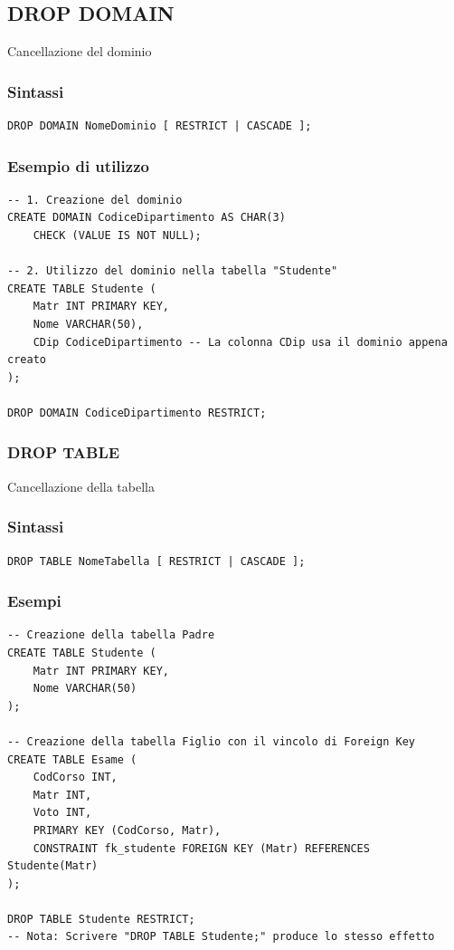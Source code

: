 \subsection{DROP DOMAIN}
Cancellazione del dominio

\subsubsection{Sintassi}
\begin{lstlisting}[language=sql_generic]
DROP DOMAIN NomeDominio [ RESTRICT | CASCADE ];
\end{lstlisting}

\subsubsection{Esempio di utilizzo}
\begin{lstlisting}[language=sql_generic]
-- 1. Creazione del dominio
CREATE DOMAIN CodiceDipartimento AS CHAR(3)
    CHECK (VALUE IS NOT NULL);

-- 2. Utilizzo del dominio nella tabella "Studente"
CREATE TABLE Studente (
    Matr INT PRIMARY KEY,
    Nome VARCHAR(50),
    CDip CodiceDipartimento -- La colonna CDip usa il dominio appena creato
);

DROP DOMAIN CodiceDipartimento RESTRICT;
\end{lstlisting}

\subsubsection{DROP TABLE}
Cancellazione della tabella

\subsubsection{Sintassi}
\begin{lstlisting}
DROP TABLE NomeTabella [ RESTRICT | CASCADE ];
\end{lstlisting}

\subsubsection{Esempi}
\begin{lstlisting}[language=sql_generic]
-- Creazione della tabella Padre
CREATE TABLE Studente (
    Matr INT PRIMARY KEY,
    Nome VARCHAR(50)
);

-- Creazione della tabella Figlio con il vincolo di Foreign Key
CREATE TABLE Esame (
    CodCorso INT,
    Matr INT,
    Voto INT,
    PRIMARY KEY (CodCorso, Matr),
    CONSTRAINT fk_studente FOREIGN KEY (Matr) REFERENCES Studente(Matr)
);

DROP TABLE Studente RESTRICT;
-- Nota: Scrivere "DROP TABLE Studente;" produce lo stesso effetto
\end{lstlisting}
